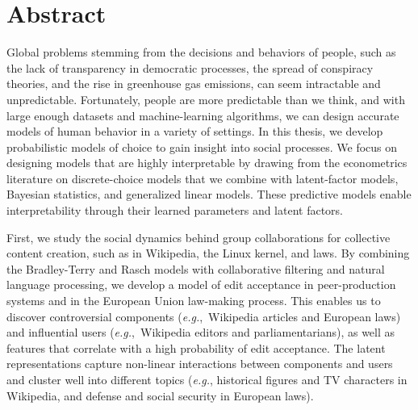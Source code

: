 \cleardoublepage
\chapter*{Abstract}

Global problems stemming from the decisions and behaviors of people, such as the lack of transparency in democratic processes, the spread of conspiracy theories, and the rise in greenhouse gas emissions, can seem intractable and unpredictable.
Fortunately, people are more predictable than we think, and with large enough datasets and machine-learning algorithms, we can design accurate models of human behavior in a variety of settings.
In this thesis, we develop probabilistic models of choice to gain insight into social processes.
We focus on designing models that are highly interpretable by drawing from the econometrics literature on discrete-choice models that we combine with latent-factor models, Bayesian statistics, and generalized linear models.
These predictive models enable interpretability through their learned parameters and latent factors.

First, we study the social dynamics behind group collaborations for collective content creation, such as in Wikipedia, the Linux kernel, and laws.
By combining the Bradley-Terry and Rasch models with collaborative filtering and natural language processing, we develop a model of edit acceptance in peer-production systems and in the European Union law-making process.
This enables us to discover controversial components (\textit{e.g.},~Wikipedia articles and European laws) and influential users (\textit{e.g.},~Wikipedia editors and parliamentarians), as well as features that correlate with a high probability of edit acceptance.
The latent representations capture non-linear interactions between components and users and cluster well into different topics (\textit{e.g.}, historical figures and TV characters in Wikipedia, and defense and social security in European laws).

